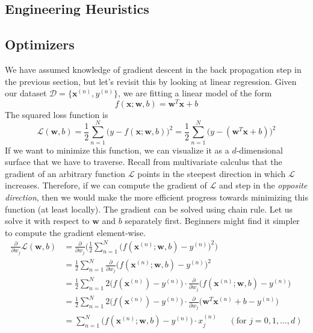 \subsection{Engineering Heuristics}

  \subsection{Optimizers}

    We have assumed knowledge of gradient descent in the back propagation step in the previous section, but let's revisit this by looking at linear regression. Given our dataset $\mathcal{D} = \{\mathbf{x}^(n), y^{(n)}\}$, we are fitting a linear model of the form 
    \begin{equation}
      f(\mathbf{x}; \mathbf{w}, b) = \mathbf{w}^T \mathbf{x} + b
    \end{equation} 
    The squared loss function is 
    \begin{equation}
      \mathcal{L}(\mathbf{w}, b) = \frac{1}{2} \sum_{n=1}^N \big( y - f(\mathbf{x}; \mathbf{w}, b) \big)^2 = \frac{1}{2} \sum_{n=1}^N \big( y - (\mathbf{w}^T \mathbf{x} + b) \big)^2  
    \end{equation}
    If we want to minimize this function, we can visualize it as a $d$-dimensional surface that we have to traverse. Recall from multivariate calculus that the gradient of an arbitrary function $\mathcal{L}$ points in the steepest direction in which $\mathcal{L}$ increases. Therefore, if we can compute the gradient of $\mathcal{L}$ and step in the \textit{opposite direction}, then we would make the more efficient progress towards minimizing this function (at least locally). The gradient can be solved using chain rule. Let us solve it with respect to $\mathbf{w}$ and $b$ separately first. Beginners might find it simpler to compute the gradient element-wise. 
    \begin{align}
      \frac{\partial}{\partial w_j} \mathcal{L}(\mathbf{w}, b) 
      & = \frac{\partial}{\partial w_j} \bigg(\frac{1}{2} \sum_{n=1}^N \Big( f (\mathbf{x}^{(n)}; \mathbf{w}, b) - y^{(n)} \Big)^2 \bigg) \\
      & = \frac{1}{2} \sum_{n=1}^N \frac{\partial}{\partial w_j} \Big( f(\mathbf{x}^{(n)}; \mathbf{w}, b) - y^{(n)}\Big)^2 \\
      & = \frac{1}{2} \sum_{n=1}^N 2 \Big( f(\mathbf{x}^{(n)}) - y^{(n)}\Big) \cdot \frac{\partial}{\partial w_j} \big( f(\mathbf{x}^{(n)}; \mathbf{w}, b) - y^{(n)} \big) \\
      & = \frac{1}{2} \sum_{n=1}^N 2 \Big( f(\mathbf{x}^{(n)}) - y^{(n)}\Big) \cdot \frac{\partial}{\partial w_j} \big( \mathbf{w}^T \mathbf{x}^{(n)} + b - y^{(n)} \big) \\
      & = \sum_{n=1}^N \big( f(\mathbf{x}^{(n)}; \mathbf{w}, b) - y^{(n)}\big) \cdot x_j^{(n)} \;\;\;\;\;(\text{for } j = 0, 1, \ldots, d)
    \end{align}
